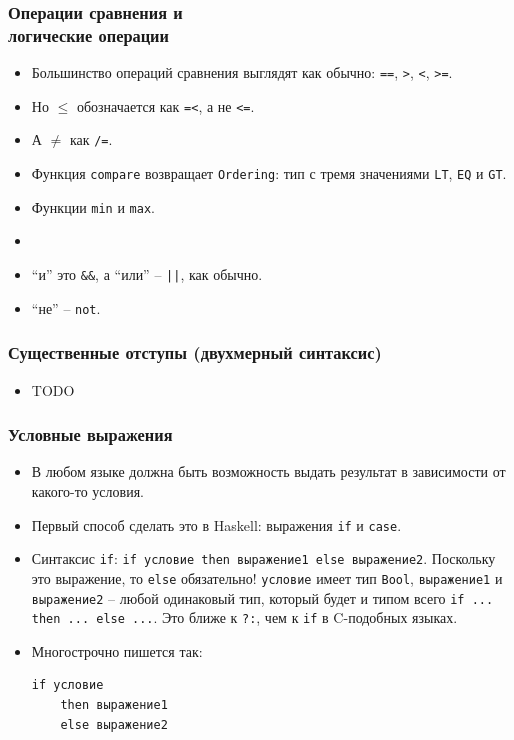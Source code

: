 \documentclass[12pt]{beamer}
\begin{document}
\begin{frame}[fragile]
\frametitle{Операции сравнения и\\логические операции}
\begin{itemize}
    \item Большинство операций сравнения выглядят как обычно: \lstinline|==|, \lstinline|>|, \lstinline|<|, \lstinline|>=|.
    \item Но $\leq$ обозначается как \lstinline|=<|, а не \lstinline|<=|.
    \item А $\neq$ как \lstinline|/=|.
    \item Функция \lstinline|compare| возвращает \lstinline|Ordering|: тип с тремя значениями \lstinline|LT|, \lstinline|EQ| и \lstinline|GT|.
    \item Функции \lstinline|min| и \lstinline|max|.
    \item[]
    \item \enquote{и} это \lstinline|&&|, а \enquote{или} -- \lstinline!||!, как обычно. 
    \item \enquote{не} -- \lstinline|not|.
\end{itemize}
\end{frame}

\begin{frame}[fragile]
\frametitle{Существенные отступы (двухмерный синтаксис)}
\begin{itemize}
    \item TODO
\end{itemize}
\end{frame}

\begin{frame}[fragile]
\frametitle{Условные выражения}
\begin{itemize}
    \item В любом языке должна быть возможность выдать результат в зависимости от какого-то условия.
    \item Первый способ сделать это в Haskell: выражения \lstinline|if| и \lstinline|case|.
    \item Синтаксис \lstinline|if|: \lstinline|if условие then выражение1 else выражение2|. Поскольку это выражение, то \lstinline|else| обязательно! \lstinline|условие| имеет тип \lstinline|Bool|, \lstinline|выражение1| и \lstinline|выражение2| -- любой одинаковый тип, который будет и типом всего  \lstinline|if ... then ... else ...|. Это ближе к \lstinline|?:|, чем к \lstinline|if| в C-подобных языках.
    \item Многострочно пишется так:
\begin{lstlisting}
if условие 
    then выражение1 
    else выражение2
\end{lstlisting}
\end{itemize}
\end{frame}
\end{document}
